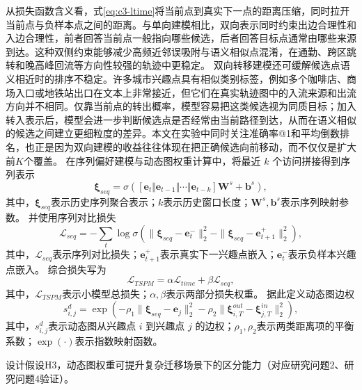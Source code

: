 从损失函数含义看，式\eqref{eq:c3-ltime}将当前点到真实下一点的距离压缩，同时拉开当前点与负样本点之间的距离。与单向建模相比，双向表示同时约束出边合理性和入边合理性，前者回答当前点一般指向哪些候选，后者回答目标点通常由哪些来源到达。这种双侧约束能够减少高频近邻误吸附与语义相似点混淆，在通勤、跨区跳转和晚高峰回流等方向性较强的轨迹中更稳定。
双向转移建模还可缓解候选点语义相近时的排序不稳定。许多城市兴趣点具有相似类别标签，例如多个咖啡店、商场入口或地铁站出口在文本上非常接近，但它们在真实轨迹图中的入流来源和出流方向并不相同。仅靠当前点的转出概率，模型容易把这类候选视为同质目标；加入转入表示后，模型会进一步判断候选点是否经常由当前路径到达，从而在语义相似的候选之间建立更细粒度的差异。本文在实验中同时关注准确率@1和平均倒数排名，也正是因为双向建模的收益往往体现在把正确候选向前移动，而不仅仅是扩大前$K$个覆盖。
在序列偏好建模与动态图权重计算中，将最近 $k$ 个访问拼接得到序列表示
\begin{equation}
\boldsymbol{\xi}_{seq}=\sigma\left([\mathbf{e}_t\Vert\mathbf{e}_{t-1}\Vert\cdots\Vert\mathbf{e}_{t-k}]\mathbf{W}^{s}+\mathbf{b}^{s}\right),
\label{eq:c3-xi-seq}
\end{equation}
其中，$\boldsymbol{\xi}_{seq}$表示历史序列聚合表示；$k$表示历史窗口长度；$\mathbf{W}^{s},\mathbf{b}^{s}$表示序列映射参数。
并使用序列对比损失
\begin{equation}
\mathcal{L}_{seq}=-\sum_t\log\sigma\left(\|\boldsymbol{\xi}_{seq}-\mathbf{e}^{-}_t\|_2^2-\|\boldsymbol{\xi}_{seq}-\mathbf{e}^{+}_{t+1}\|_2^2\right),
\label{eq:c3-lseq}
\end{equation}
其中，$\mathcal{L}_{seq}$表示序列对比损失；$\mathbf{e}^{+}_{t+1}$表示真实下一兴趣点嵌入；$\mathbf{e}^{-}_{t}$表示负样本兴趣点嵌入。
综合损失写为
\begin{equation}
\mathcal{L}_{TSPM}=\alpha\mathcal{L}_{time}+\beta\mathcal{L}_{seq},
\label{eq:c3-ltspm}
\end{equation}
其中，$\mathcal{L}_{TSPM}$表示小模型总损失；$\alpha,\beta$表示两部分损失权重。
据此定义动态图边权
\begin{equation}
s^d_{i,j}=\exp\left(-\rho_1\|\boldsymbol{\xi}_{seq}-\mathbf{e}_j\|_2^2-\rho_2\|\boldsymbol{\xi}^{out}_{i,T}-\boldsymbol{\xi}^{in}_{j,T}\|_2^2\right),
\label{eq:c3-edgew}
\end{equation}
其中，$s^d_{i,j}$表示动态图从兴趣点 $i$ 到兴趣点 $j$ 的边权；$\rho_1,\rho_2$表示两类距离项的平衡系数；$\exp(\cdot)$表示指数映射函数。

{\heiti{}设计假设H3，}动态图权重可提升复杂迁移场景下的区分能力（对应研究问题2、研究问题4验证）。

